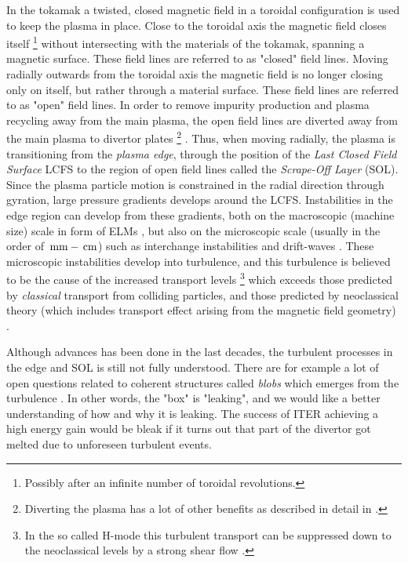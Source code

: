 In the tokamak a twisted, closed magnetic field in a toroidal configuration is used to keep the plasma in place.
Close to the toroidal axis the magnetic field closes itself
%
\footnote{Possibly after an infinite number of toroidal revolutions.}
%
without intersecting with the materials of the tokamak, spanning a magnetic surface.
These field lines are referred to as "closed" field lines.
Moving radially outwards from the toroidal axis the magnetic field is no longer closing only on itself, but rather through a material surface.
These field lines are referred to as "open" field lines.
In order to remove impurity production and plasma recycling away from the main plasma, the open field lines are diverted away from the main plasma to divertor plates%
%
\footnote{Diverting the plasma has a lot of other benefits as described in detail in \cite{Stangeby2000book,Stacey2012book}.}%
%
.
Thus, when moving radially, the plasma is transitioning from the \emph{plasma edge}, through the position of the \emph{Last Closed Field Surface} LCFS to the region of open field lines called the \emph{Scrape-Off Layer} (SOL).
Since the plasma particle motion is constrained in the radial direction through gyration, large pressure gradients develops around the LCFS.
Instabilities in the edge region can develop from these gradients, both on the macroscopic (machine size) scale in form of ELMs \cite{Zohm1996}, but also on the microscopic scale (usually in the order of $\, \text{mm} - \, \text{cm}$) such as interchange instabilities \cite{Scott2005b} and drift-waves \cite{Tynan2009}.
These microscopic instabilities develop into turbulence, and this turbulence is believed to be the cause of the increased transport levels%
%
\footnote{In the so called H-mode this turbulent transport can be suppressed down to the neoclassical levels by a strong shear flow \cite{Burrell1997}.} %
%
which exceeds those predicted by \emph{classical} transport from colliding particles, and those predicted by neoclassical theory (which includes transport effect arising from the magnetic field geometry) \cite{Wootton1990}.

Although advances has been done in the last decades, the turbulent processes in the edge and SOL is still not fully understood.
There are for example a lot of open questions related to coherent structures called \emph{blobs} which emerges from the turbulence \cite{DIppolito2011}.
In other words, the "box" is "leaking", and we would like a better understanding of how and why it is leaking.
The success of ITER achieving a high energy gain would be bleak if it turns out that part of the divertor got melted due to unforeseen turbulent events.

